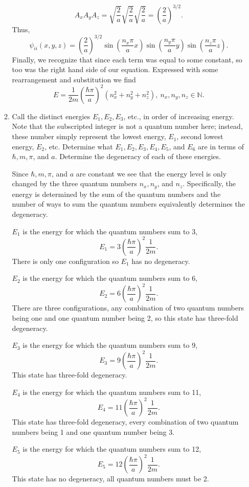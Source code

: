 \documentclass[a4paper, 12pt]{config/homework}
\begin{document}
\begin{enumerate}
\begin{enumerate}[label=(\alph*.)]
\[A_x A_y A_z = \sqrt{\frac{2}{a}}\sqrt{\frac{2}{a}}\sqrt{\frac{2}{a}} = \left(\frac{2}{a}\right)^{3/2}.\]
Thus,
\[\psi_{ii}(x,y,z) = \left(\frac{2}{a}\right)^{3/2}\sin\left(\frac{n_x\pi}{a}x\right)\sin\left(\frac{n_y\pi}{a}y\right)\sin\left(\frac{n_z\pi}{a}z\right).\]
Finally, we recognize that since each term was equal to some constant, so too was the right hand side of our equation. Expressed with some rearrangement and substitution we find
\[E=\frac{1}{2m}\left(\frac{\hbar\pi}{a}\right)^2\left(n_x^2 + n_y^2 + n_z^2 \right),\ n_x,n_y,n_z\in\mathbb{N}.\]

\pagebreak
\item Call the distinct energies \(E_1,E_2,E_3\), etc., in order of increasing energy. Note that the subscripted integer is not a quantum number here; instead, these number simply represent the lowest energy, \(E_1\), second lowest energy, \(E_2\), etc. Determine what \(E_1,E_2,E_3,E_4,E_5\), and \(E_6\) are in terms of \(\hbar,m,\pi\), and \(a\). Determine the degeneracy of each of these energies.

Since \(\hbar,m,\pi\), and \(a\) are constant we see that the energy level is only changed by the three quantum numbers \(n_x,n_y\), and \(n_z\). Specifically, the energy is determined by the sum of the quantum numbers and the number of ways to sum the quantum numbers equivalently determines the degeneracy.

\(E_1\) is the energy for which the quantum numbers sum to 3,
\[E_1 = 3 \left(\frac{\hbar\pi}{a}\right)^2\frac{1}{2m}.\]
There is only one configuration so \(E_1\) has no degeneracy.

\(E_2\) is the energy for which the quantum numbers sum to 6,
\[E_2 = 6 \left(\frac{\hbar\pi}{a}\right)^2\frac{1}{2m}. \]
There are three configurations, any combination of two quantum numbers being one and one quantum number being 2, so this state has three-fold degeneracy.

\(E_3\) is the energy for which the quantum numbers sum to 9,
\[E_3 = 9\left(\frac{\hbar\pi}{a}\right)^2\frac{1}{2m}.\]
This state has three-fold degeneracy.

\(E_4\) is the energy for which the quantum numbers sum to 11,
\[E_4 = 11 \left(\frac{\hbar\pi}{a}\right)^2\frac{1}{2m}.\]
This state has three-fold degeneracy, every combination of two quantum numbers being 1 and one quantum number being 3.

\(E_5\) is the energy for which the quantum numbers sum to 12,
\[E_5 = 12 \left(\frac{\hbar\pi}{a}\right)^2\frac{1}{2m}.\]
This state has no degeneracy, all quantum numbers must be 2.


\end{enumerate}
\end{enumerate}
\end{document}
